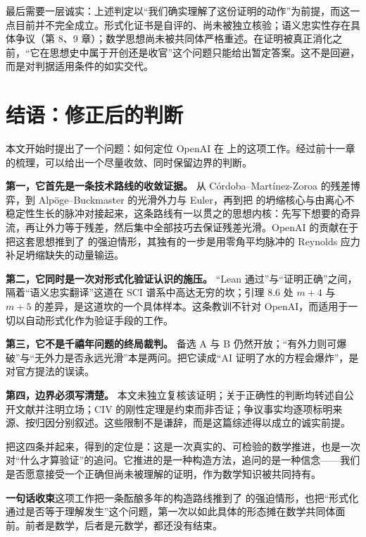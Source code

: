 最后需要一层诚实：上述判定以“我们确实理解了这份证明的动作”为前提，而这一点目前并不完全成立。形式化证书是自评的、尚未被独立核验；语义忠实性存在具体争议（第 8、9 章）；数学思想尚未被共同体严格重述。在证明被真正消化之前，“它在思想史中属于开创还是收官”这个问题只能给出暂定答案。这不是回避，而是对判据适用条件的如实交代。

\section{结语：修正后的判断}

本文开始时提出了一个问题：如何定位 OpenAI 在 \NS{} 上的这项工作。经过前十一章的梳理，可以给出一个尽量收敛、同时保留边界的判断。

\textbf{第一，它首先是一条技术路线的收敛证据。} 从 Córdoba--Martínez-Zoroa 的残差博弈，到 Alpöge--Buckmaster 的光滑外力与 Euler，再到把 \NS{} 的坍缩核心与由离心不稳定性生长的脉冲对接起来，这条路线有一以贯之的思想内核：先写下想要的奇异流，再让外力等于残差，然后集中全部技巧去保证残差光滑。OpenAI 的贡献在于把这套思想推到了 \NS{} 的强迫情形，其独有的一步是用零角平均脉冲的 Reynolds 应力补足坍缩缺失的动量输运。

\textbf{第二，它同时是一次对形式化验证认识的施压。} “Lean 通过”与“证明正确”之间，隔着“语义忠实翻译”这道在 SCI 谱系中高达无穷的坎；引理 8.6 处 $m+4$ 与 $m+5$ 的差异，是这道坎的一个具体样本。这条教训不针对 OpenAI，而适用于一切以自动形式化作为验证手段的工作。

\textbf{第三，它不是千禧年问题的终局裁判。} 备选 A 与 B 仍然开放；“有外力则可爆破”与“无外力是否永远光滑”本是两问。把它读成“AI 证明了水的方程会爆炸”，是对官方提法的误读。

\textbf{第四，边界必须写清楚。} 本文未独立复核该证明；关于正确性的判断均转述自公开文献并注明立场；CIV 的刚性定理是约束而非否证；争议事实均逐项标明来源、按归因分别叙述。这些限制不是谦辞，而是这篇综述得以成立的诚实前提。

把这四条并起来，得到的定位是：这是一次真实的、可检验的数学推进，也是一次对“什么才算验证”的追问。它推进的是一种构造方法，追问的是一种信念——我们是否愿意接受一个正确但尚未被理解的证明，作为数学知识被共同持有。

\begin{keybox}
\textbf{一句话收束}\quad 这项工作把一条酝酿多年的构造路线推到了 \NS{} 的强迫情形，也把“形式化通过是否等于理解发生”这个问题，第一次以如此具体的形态摊在数学共同体面前。前者是数学，后者是元数学，都还没有结束。
\end{keybox}

\appendix

